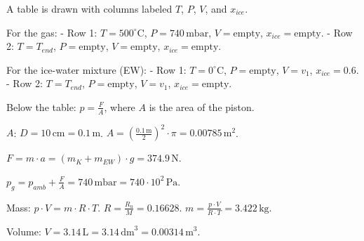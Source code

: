 A table is drawn with columns labeled \( T \), \( P \), \( V \), and \( x_{ice} \).  

For the gas:  
- Row 1: \( T = 500^\circ \text{C} \), \( P = 740 \, \text{mbar} \), \( V = \text{empty} \), \( x_{ice} = \text{empty} \).  
- Row 2: \( T = T_{end} \), \( P = \text{empty} \), \( V = \text{empty} \), \( x_{ice} = \text{empty} \).  

For the ice-water mixture (EW):  
- Row 1: \( T = 0^\circ \text{C} \), \( P = \text{empty} \), \( V = v_{1} \), \( x_{ice} = 0.6 \).  
- Row 2: \( T = T_{end} \), \( P = \text{empty} \), \( V = v_{1} \), \( x_{ice} = \text{empty} \).  

Below the table:  
\( p = \frac{F}{A} \), where \( A \) is the area of the piston.  

\( A \):  
\( D = 10 \, \text{cm} = 0.1 \, \text{m} \).  
\( A = \left( \frac{0.1 \, \text{m}}{2} \right)^2 \cdot \pi = 0.00785 \, \text{m}^2 \).  

\( F = m \cdot a = (m_{K} + m_{EW}) \cdot g = 374.9 \, \text{N} \).  

\( p_{g} = p_{amb} + \frac{F}{A} = 740 \, \text{mbar} = 740 \cdot 10^2 \, \text{Pa} \).  

Mass:  
\( p \cdot V = m \cdot R \cdot T \).  
\( R = \frac{R_u}{M} = 0.16628 \).  
\( m = \frac{p \cdot V}{R \cdot T} = 3.422 \, \text{kg} \).  

Volume:  
\( V = 3.14 \, \text{L} = 3.14 \, \text{dm}^3 = 0.00314 \, \text{m}^3 \).
